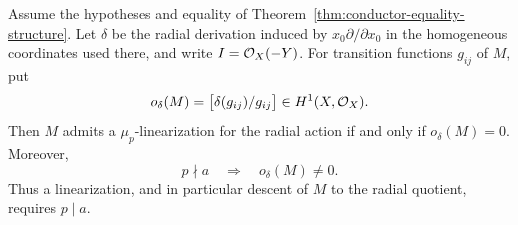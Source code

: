 \begin{proposition}\label{prop:radial-linearization-obstruction}
Assume the hypotheses and equality of
Theorem~\ref{thm:conductor-equality-structure}.
Let $\delta$ be the radial derivation induced by
$x_0\partial/\partial x_0$ in the homogeneous coordinates used there, and
write $I=\mathcal O_X(-Y)$.
For transition functions $g_{ij}$ of $M$, put
\[
 o_\delta(M)=
 \bigl[\delta(g_{ij})/g_{ij}\bigr]\in H^1(X,\mathcal O_X).
\]
Then $M$ admits a $\mu_p$-linearization for the radial action if
and only if $o_\delta(M)=0$.
Moreover,
\begin{equation}\label{eq:radial-leading-obstruction}
 p\nmid a\quad\Longrightarrow\quad o_\delta(M)\ne0.
\end{equation}
Thus a linearization, and in particular descent of $M$ to the
radial quotient, requires $p\mid a$.
\end{proposition}

